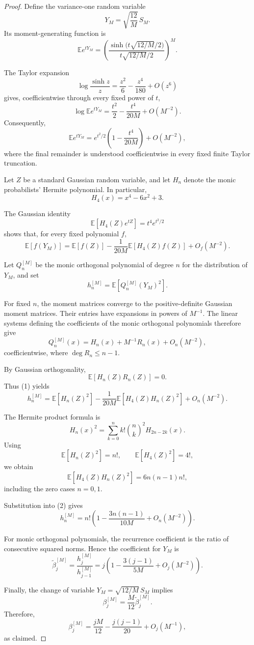 \documentclass[10pt]{amsart}
\begin{document}
\begin{proof}

Define the variance-one random variable
\[
Y_M=\sqrt{\frac{12}{M}}\,S_M.
\]
Its moment-generating function is
\[
\mathbb E e^{tY_M}
 =
\left(
\frac{\sinh\bigl(t\sqrt{12/M}/2\bigr)}
     {t\sqrt{12/M}/2}
\right)^M.
\]

The Taylor expansion
\[
\log\frac{\sinh z}{z}
 =\frac{z^2}{6}
  -\frac{z^4}{180}
  +O(z^6)
\]
gives, coefficientwise through every fixed power of $t$,
\[
\log\mathbb E e^{tY_M}
 =
\frac{t^2}{2}
 -\frac{t^4}{20M}
 +O(M^{-2}).
\]
Consequently,
\[
\mathbb E e^{tY_M}
 =
e^{t^2/2}
\left(1-\frac{t^4}{20M}\right)
+O(M^{-2}),
\]
where the final remainder is understood coefficientwise
in every fixed finite Taylor truncation.

Let $Z$ be a standard Gaussian random variable, and
let $H_n$ denote the monic probabilists' Hermite polynomial.
In particular,
\[
H_4(x)=x^4-6x^2+3.
\]

The Gaussian identity
\[
\mathbb E[H_4(Z)e^{tZ}]
 =t^4 e^{t^2/2}
\]
shows that, for every fixed polynomial $f$,
\[
\mathbb E[f(Y_M)]
 =
\mathbb E[f(Z)]
 -\frac{1}{20M}\mathbb E[H_4(Z)f(Z)]
 +O_f(M^{-2}).
\tag{1}
\]

Let $Q_n^{[M]}$ be the monic orthogonal polynomial of
degree $n$ for the distribution of $Y_M$, and set
\[
h_n^{[M]}
 =\mathbb E\!\left[Q_n^{[M]}(Y_M)^2\right].
\]

For fixed $n$, the moment matrices converge to the
positive-definite Gaussian moment matrices. Their
entries have expansions in powers of $M^{-1}$.
The linear systems defining the coefficients of the
monic orthogonal polynomials therefore give
\[
Q_n^{[M]}(x)
 =H_n(x)+M^{-1}R_n(x)+O_n(M^{-2}),
\]
coefficientwise, where $\deg R_n\leq n-1$.

By Gaussian orthogonality,
\[
\mathbb E[H_n(Z)R_n(Z)]=0.
\]
Thus (1) yields
\[
h_n^{[M]}
 =
\mathbb E[H_n(Z)^2]
 -\frac{1}{20M}
  \mathbb E[H_4(Z)H_n(Z)^2]
 +O_n(M^{-2}).
\tag{2}
\]

The Hermite product formula is
\[
H_n(x)^2
 =
\sum_{k=0}^{n}
 k!\binom nk^2 H_{2n-2k}(x).
\]
Using
\[
\mathbb E[H_n(Z)^2]=n!,
\qquad
\mathbb E[H_4(Z)^2]=4!,
\]
we obtain
\[
\mathbb E[H_4(Z)H_n(Z)^2]
 =6n(n-1)n!,
\]
including the zero cases $n=0,1$.

Substitution into (2) gives
\[
h_n^{[M]}
 =
n!\left(
1-\frac{3n(n-1)}{10M}
+O_n(M^{-2})
\right).
\]

For monic orthogonal polynomials, the recurrence
coefficient is the ratio of consecutive squared norms.
Hence the coefficient for $Y_M$ is
\[
\widetilde\beta_j^{[M]}
 =\frac{h_j^{[M]}}{h_{j-1}^{[M]}}
 =j\left(
1-\frac{3(j-1)}{5M}
+O_j(M^{-2})
\right).
\]

Finally, the change of variable
$Y_M=\sqrt{12/M}\,S_M$ implies
\[
\beta_j^{[M]}
 =\frac{M}{12}\widetilde\beta_j^{[M]}.
\]
Therefore,
\[
\beta_j^{[M]}
 =
\frac{jM}{12}
-\frac{j(j-1)}{20}
+O_j(M^{-1}),
\]
as claimed.
\end{proof}
\end{document}
